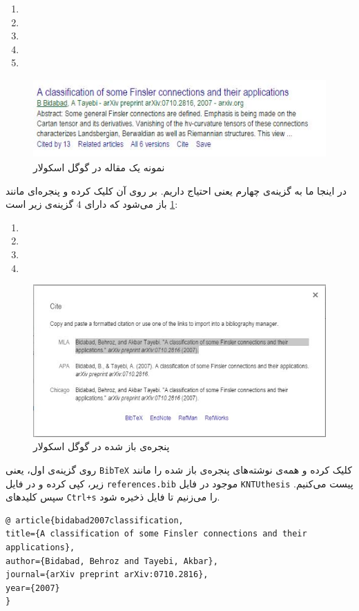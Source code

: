 \begin{enumerate}
\item {}

\item {}

\item {}

\item {}

\item {}
\end{enumerate}
\begin{figure}[!h]
\includegraphics[height=3cm]{Images/Chapter2/bidabad.jpg}
\caption{نمونه یک مقاله در گوگل اسکولار}
\end{figure}
در اینجا ما به گزینه‌ی چهارم یعنی
احتیاج داریم. بر روی آن کلیک کرده و پنجره‌ای مانند
\cref{fig.2}
باز می‌شود که دارای $4$ گزینه‌ی زیر است:
\begin{enumerate}
\item {}

\item {}

\item {}

\item {}
\end{enumerate}
\begin{figure}
\centering\includegraphics[scale=.6]{Images/Chapter2/bibref.jpg}
\caption{پنجره‌ی باز شده در گوگل اسکولار}\label{fig.2}
\end{figure}
روی گزینه‌ی اول، یعنی
\verb;BibTeX;
کلیک کرده و همه‌ی نوشته‌های پنجره‌ی باز شده را مانند زیر، کپی کرده و در فایل
\verb;references.bib;
موجود در فایل
\verb;KNTUthesis;
پیست می‌کنیم. سپس کلیدهای
\verb;Ctrl+s;
را می‌زنیم تا فایل ذخیره شود.\\
\begin{latin}
	\normalsize
\begin{verbatim}
@ article{bidabad2007classification,
title={A classification of some Finsler connections and their applications},
author={Bidabad, Behroz and Tayebi, Akbar},
journal={arXiv preprint arXiv:0710.2816},
year={2007}
}
\end{verbatim}
\end{latin}
